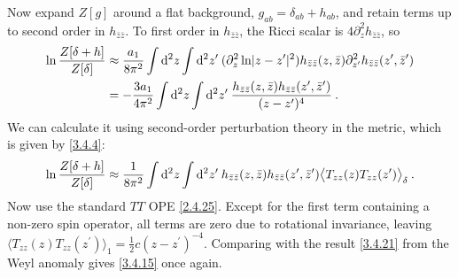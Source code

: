 Now expand $Z[g]$ around a flat background, $g_{a b}=\delta_{a b}+h_{a b}$, and retain terms up to second order in $h_{\bar{z} \bar{z}} $.    
To first order in $h_{\bar{z} \bar{z}}$, the Ricci scalar is $4 \partial_{z}^{2} h_{\bar{z} \bar{z}}$, so    
\begin{align}
	\ln \frac{Z[\delta+h]}{Z[\delta]} & \approx \frac{a_{1}}{8 \pi^{2}} \int \mathrm{d}^{2} z \int \mathrm{d}^{2} z^{\prime} \:
	(\partial_{z}^{2} \ln \lvert z-z^{\prime}\rvert^{2}) h_{\bar{z} \bar{z}}(z, \bar{z}) \partial_{z^{\prime}}^{2} h_{\bar{z} \bar{z}}(z^{\prime}, \bar{z}^{\prime}) \nonumber \\
	&=-\frac{3 a_{1}}{4 \pi^{2}} \int \mathrm{d}^{2} z \int \mathrm{d}^{2} z^{\prime} \: \frac{h_{\bar{z} \bar{z}}(z, \bar{z}) h_{\bar{z} \bar{z}}(z^{\prime}, \bar{z}^{\prime})}{(z-z^{\prime})^{4}} \:. \label{3.4.21}
\end{align}
We can calculate it using second-order perturbation theory in the metric, which is given by \eqref{3.4.4}:    
\begin{equation}
	\ln \frac{Z[\delta+h]}{Z[\delta]} \approx \frac{1}{8 \pi^{2}} \int \mathrm{d}^{2} z \int \mathrm{d}^{2} z^{\prime} \: h_{\bar{z} \bar{z}}(z, \bar{z}) h_{\bar{z} \bar{z}}(z^{\prime}, \bar{z}^{\prime})\bigl\langle T_{z z}(z) T_{z z}(z^{\prime})\bigr\rangle_{\delta} \:. \label{3.4.22}
\end{equation}
Now use the standard $TT$ OPE \eqref{2.4.25}. Except for the first term containing a non-zero spin operator, all terms are zero due to rotational invariance, leaving $\bigl\langle T_{z z}(z) T_{z z}(z^{\prime})\bigr\rangle_{1}=\frac{1}{2} c(z-z^{\prime})^{-4}$. Comparing with the result \eqref{3.4.21} from the Weyl anomaly gives \eqref{3.4.15} once again.    
